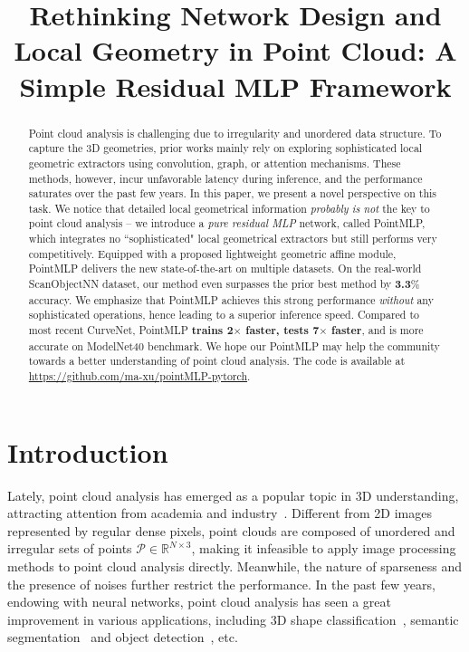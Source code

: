 \title{Rethinking Network Design and Local Geometry in Point Cloud: A Simple Residual MLP Framework}



\maketitle

\begin{abstract}
Point cloud analysis is challenging due to irregularity and unordered data structure. To capture the 3D geometries, prior works mainly rely on exploring sophisticated local geometric extractors using convolution, graph, or attention mechanisms. These methods, however, incur unfavorable latency during inference, and the performance saturates over the past few years. In this paper, we present a novel perspective on this task. We notice that detailed local geometrical information \emph{probably is not} the key to point cloud analysis -- we introduce a \emph{pure residual MLP} network, called PointMLP, which integrates no ``sophisticated" local geometrical extractors but still performs very competitively. Equipped with a proposed lightweight geometric affine module, PointMLP delivers the new state-of-the-art on multiple datasets. On the real-world ScanObjectNN dataset, our method even surpasses the prior best method by \textbf{3.3}\% accuracy. 
We emphasize that PointMLP achieves this strong performance \emph{without} any sophisticated operations, hence leading to a superior inference speed. Compared to most recent CurveNet, PointMLP \textbf{trains 2$\times$ faster, tests 7$\times$ faster}, and is more accurate on ModelNet40 benchmark.
We hope our PointMLP may help the community towards a better understanding of point cloud analysis. 
The code is available at \href{https://github.com/ma-xu/pointMLP-pytorch}{https://github.com/ma-xu/pointMLP-pytorch}.

\end{abstract}

\section{Introduction}
Lately, point cloud analysis has emerged as a popular topic in 3D understanding, attracting attention from academia and industry~\citep{qi2017pointnet,shi2019pointrcnn,xu2020squeezesegv3}.
Different from 2D images represented by regular dense pixels, point clouds are composed of unordered and irregular sets of points $\mathcal{P}\in\mathbb{R}^{N\times3}$, making it infeasible to apply image processing methods to point cloud analysis directly. Meanwhile, the nature of sparseness and the presence of noises further restrict the performance. In the past few years, endowing with neural networks, point cloud analysis has seen a great improvement in various applications, including 3D shape classification~\citep{qi2017pointnet}, semantic segmentation~\citep{hu2020randla} and object detection~\citep{shi2020point}, etc. 

